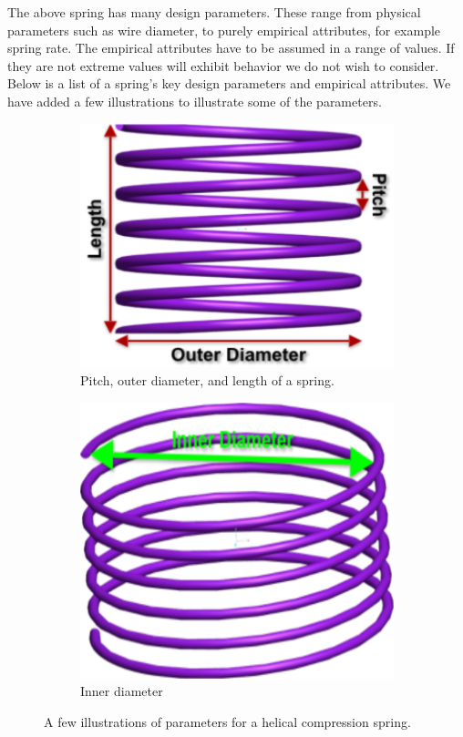 \documentclass[10pt]{article}
\begin{document}
The above spring has many design parameters. These range from physical parameters such as wire diameter, to purely empirical attributes, for example spring rate. The empirical attributes have to be assumed in a range of values. If they are not extreme values will exhibit behavior we do not wish to consider. Below is a list of a spring's key design parameters and empirical attributes. We have added a few illustrations to illustrate some of the parameters. \cite{Massad2015}		 
		\begin{figure}[h]
			\centering
			\begin{subfigure}{.5\textwidth}
				\includegraphics[scale=.2]{Spring_Description.png}
				\caption{Pitch, outer diameter, and length of a spring.}
				\label{Description1}
			\end{subfigure}%
			\begin{subfigure}{.5\textwidth}
				  \centering
		 		\includegraphics[scale=.2]{Spring_Description2.png}
				\caption{Inner diameter}
				  \label{Description2}
		  		
			\end{subfigure}
			 \label{Descriptions}
		  \caption{A few illustrations of parameters for a helical compression spring.}
		\end{figure}
		
\end{document}

